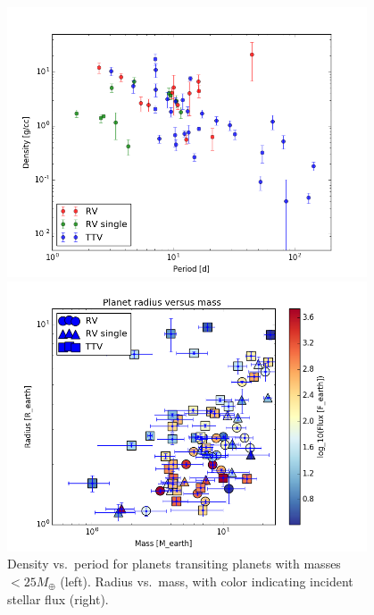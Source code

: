 \documentclass[graybox,natbib,nosecnum]{svmult}
\begin{document}
\begin{figure}
\centerline{
\includegraphics[width=0.95\textwidth]{density_vs_period_errors.png}}
\centerline{
\includegraphics[width=0.95\textwidth]{mass_radius_flux.png}}
\caption{Density vs.\ period for planets transiting planets with masses $<25 M_\oplus$ (left).  Radius
vs.\ mass, with color indicating incident stellar flux (right).}
\label{fig:density_period}
\end{figure}


\end{document}
